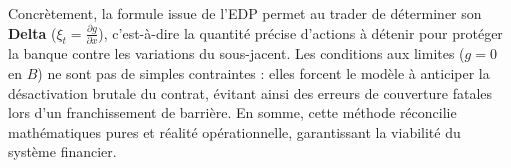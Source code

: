 \documentclass[11pt]{article}
\begin{document}
Concrètement, la formule issue de l'EDP permet au trader de déterminer son \textbf{Delta} ($\xi_t = \frac{\partial g}{\partial x}$), c'est-à-dire la quantité précise d'actions à détenir pour protéger la banque contre les variations du sous-jacent. Les conditions aux limites ($g=0$ en $B$) ne sont pas de simples contraintes : elles forcent le modèle à anticiper la désactivation brutale du contrat, évitant ainsi des erreurs de couverture fatales lors d'un franchissement de barrière. En somme, cette méthode réconcilie mathématiques pures et réalité opérationnelle, garantissant la viabilité du système financier.
\end{document}
